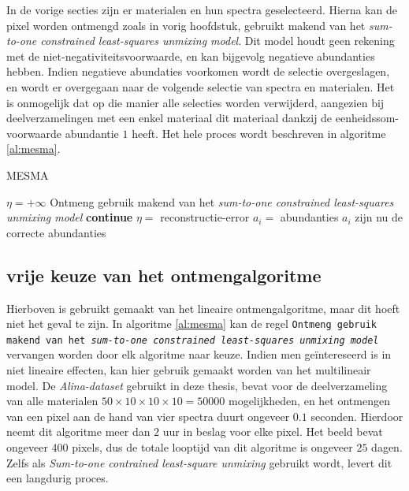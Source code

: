 \documentclass[12pt]{report}
\begin{document}
In de vorige secties zijn er materialen en hun spectra geselecteerd. Hierna kan de pixel worden ontmengd zoals in vorig hoofdstuk, gebruikt makend van het \textit{sum-to-one constrained least-squares unmixing model}. Dit model houdt geen rekening met de niet-negativiteitsvoorwaarde, en kan bijgevolg negatieve abundanties hebben. Indien negatieve abundaties voorkomen wordt de selectie overgeslagen, en wordt er overgegaan naar de volgende selectie van spectra en materialen. Het is onmogelijk dat op die manier alle selecties worden verwijderd, aangezien bij deelverzamelingen met een enkel materiaal dit materiaal dankzij de eenheidssom-voorwaarde abundantie $1$ heeft. Het hele proces wordt beschreven in algoritme \ref{al:mesma}.

\begin{algorithm}
\caption{MESMA\label{al:mesma}}
\begin{algorithmic}[1]
\State $\eta = +\infty$ 
\State Ontmeng gebruik makend van het \textit{sum-to-one constrained least-squares unmixing model}
\State \textbf{continue}
\EndIf
{}
\State $\eta = $ reconstructie-error
\State $a_i = $ abundanties
\EndIf
\EndFor
\EndFor
\State $a_i$ zijn nu de correcte abundanties
\end{algorithmic}
\end{algorithm}

\subsection{vrije keuze van het ontmengalgoritme}
Hierboven is gebruikt gemaakt van het lineaire ontmengalgoritme, maar dit hoeft niet het geval te zijn. In algoritme \ref{al:mesma} kan de regel \texttt{Ontmeng gebruik makend van het \textit{sum-to-one constrained least-squares unmixing model}} vervangen worden door elk algoritme naar keuze. Indien men ge\"intereseerd is in niet lineaire effecten, kan hier gebruik gemaakt worden van het multilineair model. De \textit{Alina-dataset} gebruikt in deze thesis, bevat voor de deelverzameling van alle materialen $50\times 10\times 10 \times 10= 50000$ mogelijkheden, en het ontmengen van een pixel aan de hand van vier spectra  duurt ongeveer $0.1$ seconden. Hierdoor neemt dit algoritme meer dan $2$ uur in beslag voor elke pixel. Het beeld bevat ongeveer 400 pixels, dus de totale looptijd van dit algoritme is ongeveer $25$ dagen. Zelfs als \textit{Sum-to-one contrained least-square unmixing} gebruikt wordt, levert dit een langdurig proces.
\end{document}
